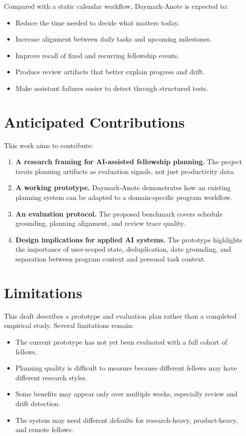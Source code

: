 \documentclass[11pt]{article}
\begin{document}
Compared with a static calendar workflow, Daymark-Anote is expected to:

\begin{itemize}[leftmargin=*]
  \item Reduce the time needed to decide what matters today.
  \item Increase alignment between daily tasks and upcoming milestones.
  \item Improve recall of fixed and recurring fellowship events.
  \item Produce review artifacts that better explain progress and drift.
  \item Make assistant failures easier to detect through structured tests.
\end{itemize}

\section{Anticipated Contributions}

This work aims to contribute:

\begin{enumerate}[leftmargin=*]
  \item \textbf{A research framing for AI-assisted fellowship planning.} The project treats planning artifacts as evaluation signals, not just productivity data.
  \item \textbf{A working prototype.} Daymark-Anote demonstrates how an existing planning system can be adapted to a domain-specific program workflow.
  \item \textbf{An evaluation protocol.} The proposed benchmark covers schedule grounding, planning alignment, and review trace quality.
  \item \textbf{Design implications for applied AI systems.} The prototype highlights the importance of user-scoped state, deduplication, date grounding, and separation between program context and personal task context.
\end{enumerate}

\section{Limitations}

This draft describes a prototype and evaluation plan rather than a completed empirical study. Several limitations remain:

\begin{itemize}[leftmargin=*]
  \item The current prototype has not yet been evaluated with a full cohort of fellows.
  \item Planning quality is difficult to measure because different fellows may have different research styles.
  \item Some benefits may appear only over multiple weeks, especially review and drift detection.
  \item The system may need different defaults for research-heavy, product-heavy, and remote fellows.
\end{itemize}
\end{document}
